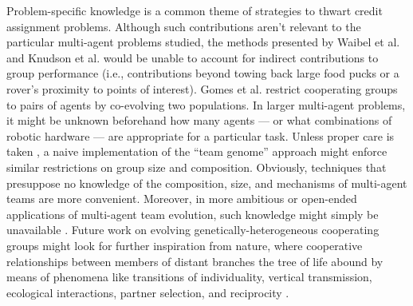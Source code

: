 Problem-specific knowledge is a common theme of strategies to thwart credit assignment problems.
Although such contributions aren't relevant to the particular multi-agent problems studied, the methods presented by Waibel et al. and Knudson et al. would be unable to account for indirect contributions to group performance (i.e., contributions beyond towing back large food pucks or a rover's proximity to points of interest).
Gomes et al. restrict cooperating groups to pairs of agents by co-evolving two populations.
In larger multi-agent problems, it might be unknown beforehand how many agents --- or what combinations of robotic hardware --- are appropriate for a particular task.
Unless proper care is taken \cite{bongard2000legion}, a naive implementation of the ``team genome'' approach might enforce similar restrictions on group size and composition.
Obviously, techniques that presuppose no knowledge of the composition, size, and mechanisms of multi-agent teams are more convenient.
Moreover, in more ambitious or open-ended applications of multi-agent team evolution, such knowledge might simply be unavailable \cite{kernbach2008symbiotic,baele2009open}.
Future work on evolving genetically-heterogeneous cooperating groups might look for further inspiration from nature, where cooperative relationships between members of distant branches the tree of life abound by means of phenomena like transitions of individuality, vertical transmission, ecological interactions, partner selection, and reciprocity \cite{vostinar2017suicide, andre2016evolutionary}.
